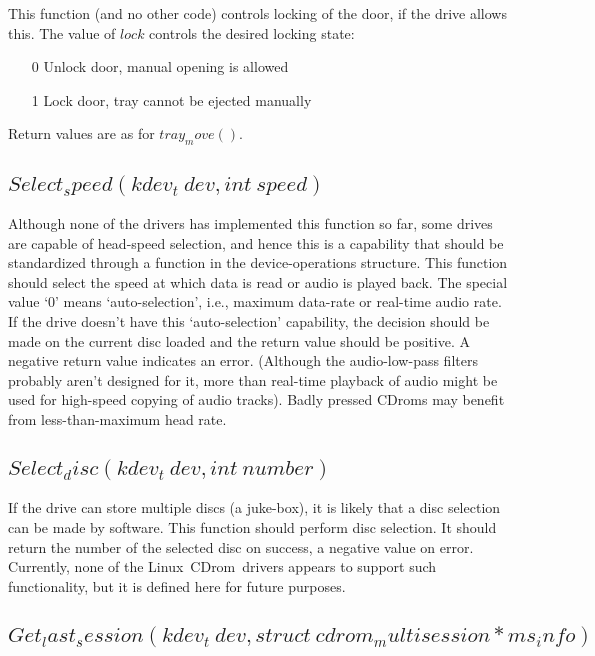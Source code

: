 \documentclass{article}
\def\linux{{\sc Linux}}
\def\cdrom{{\sc CDrom}}
\begin{document}
This function (and no other code) controls locking of the door, if the
drive allows this. The value of $lock$ controls the desired locking
state:
\begin{itemize}
\item[0] Unlock door, manual opening is allowed
\item[1] Lock door, tray cannot be ejected manually
\end{itemize}
Return values are as for $tray_move()$.

\subsection{$Select_speed(kdev_t\ dev, int\ speed)$}

Although none of the drivers has implemented this function so far,
some drives are capable of head-speed selection, and hence this is a
capability that should be standardized through a function in the
device-operations structure. This function should select the speed at
which data is read or audio is played back. The special value `0'
means `auto-selection', i.e., maximum data-rate or real-time audio
rate. If the drive doesn't have this `auto-selection' capability, the
decision should be made on the current disc loaded and the return
value should be positive. A negative return value indicates an
error. (Although the audio-low-pass filters probably aren't designed
for it, more than real-time playback of audio might be used for
high-speed copying of audio tracks). Badly pressed \cdrom s may
benefit from less-than-maximum head rate.

\subsection{$Select_disc(kdev_t\ dev, int\ number)$}

If the drive can store multiple discs (a juke-box), it is likely that
a disc selection can be made by software. This function should perform
disc selection. It should return the number of the selected disc on
success, a negative value on error. Currently, none of the \linux\ 
\cdrom\ drivers appears to support such functionality, but it is defined
here for future purposes.

\subsection{$Get_last_session(kdev_t\ dev, struct\ cdrom_multisession *
ms_info)$}
\end{document}
